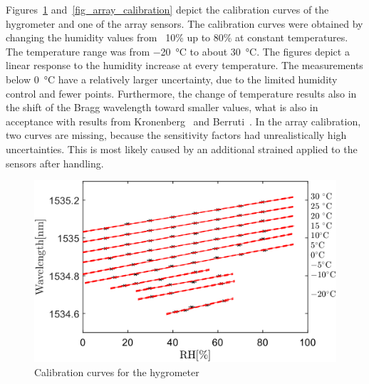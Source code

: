 \newpage
Figures~\ref{fig_single_calibration} and~\ref{fig_array_calibration} depict the calibration curves of the hygrometer and one of the array sensors. The calibration curves were obtained by changing the humidity values from ~10\% up to 80\% at constant temperatures. The temperature range was from \SI{-20}{\celsius} to about \SI{30}{\celsius}. The figures depict a linear response to the humidity increase at every temperature. The measurements below \SI{0}{\celsius} have a relatively larger uncertainty, due to the limited humidity control and fewer points. Furthermore, the change of temperature results also in the shift of the Bragg wavelength toward smaller values, what is also in acceptance with results from Kronenberg~\cite{Kronenberg:02} and Berruti~\cite{Berruti}. In the array calibration, two curves are missing, because the sensitivity factors had unrealistically high uncertainties. This is most likely caused by an additional strained applied to the sensors after handling. %

\begin{figure}[!h]
\centering
\includegraphics[width=0.8\columnwidth]{Chapter5/images/RHS.png}
\caption{Calibration curves for the hygrometer}
\label{fig_single_calibration}
\end{figure}

